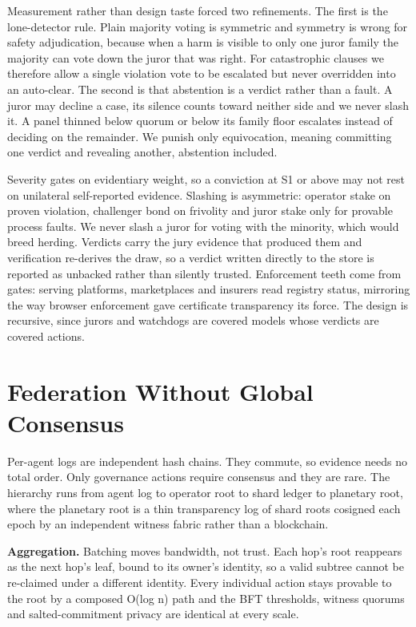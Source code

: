 \documentclass[conference]{IEEEtran}
\begin{document}
Measurement rather than design taste forced two refinements. The first is the lone-detector rule. Plain majority voting is symmetric and symmetry is wrong for safety adjudication, because when a harm is visible to only one juror family the majority can vote down the juror that was right. For catastrophic clauses we therefore allow a single violation vote to be escalated but never overridden into an auto-clear. The second is that abstention is a verdict rather than a fault. A juror may decline a case, its silence counts toward neither side and we never slash it. A panel thinned below quorum or below its family floor escalates instead of deciding on the remainder. We punish only equivocation, meaning committing one verdict and revealing another, abstention included.

Severity gates on evidentiary weight, so a conviction at S1 or above may not rest on unilateral self-reported evidence. Slashing is asymmetric: operator stake on proven violation, challenger bond on frivolity and juror stake only for provable process faults. We never slash a juror for voting with the minority, which would breed herding. Verdicts carry the jury evidence that produced them and verification re-derives the draw, so a verdict written directly to the store is reported as unbacked rather than silently trusted. Enforcement teeth come from gates: serving platforms, marketplaces and insurers read registry status, mirroring the way browser enforcement gave certificate transparency its force. The design is recursive, since jurors and watchdogs are covered models whose verdicts are covered actions.

\section{Federation Without Global Consensus}

Per-agent logs are independent hash chains. They commute, so evidence needs no total order. Only governance actions require consensus and they are rare. The hierarchy runs from agent log to operator root to shard ledger to planetary root, where the planetary root is a thin transparency log of shard roots cosigned each epoch by an independent witness fabric rather than a blockchain.

\textbf{Aggregation.} Batching moves bandwidth, not trust. Each hop's root reappears as the next hop's leaf, bound to its owner's identity, so a valid subtree cannot be re-claimed under a different identity. Every individual action stays provable to the root by a composed O(log n) path and the BFT thresholds, witness quorums and salted-commitment privacy are identical at every scale.
\end{document}
